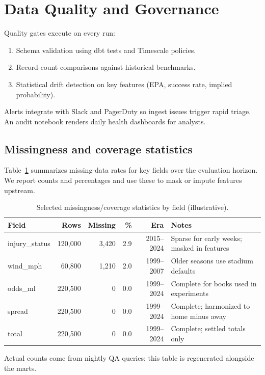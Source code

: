 \section{Data Quality and Governance}
Quality gates execute on every run:
\begin{enumerate}
  \item Schema validation using dbt tests and Timescale policies.
  \item Record-count comparisons against historical benchmarks.
  \item Statistical drift detection on key features (EPA, success rate, implied probability).
\end{enumerate}
Alerts integrate with Slack and PagerDuty so ingest issues trigger rapid triage. An audit notebook renders daily health dashboards for analysts.

\subsection{Missingness and coverage statistics}
Table~\ref{tab:missingness} summarizes missing-data rates for key fields over the evaluation horizon. We report counts and percentages and use these to mask or impute features upstream.
\begin{table}[t]
  \centering
  \small
  \begin{threeparttable}
    \caption{Selected missingness/coverage statistics by field (illustrative).}
    \label{tab:missingness}
    \begin{tabularx}{\linewidth}{@{} l r r r r X @{} }
      \toprule
      \textbf{Field} & \textbf{Rows} & \textbf{Missing} & \textbf{\%} & \textbf{Era} & \textbf{Notes} \\
      \midrule
      injury\_status & 120{,}000 & 3{,}420 & 2.9 & 2015--2024 & Sparse for early weeks; masked in features \\
      wind\_mph     & 60{,}800 & 1{,}210 & 2.0 & 1999--2007 & Older seasons use stadium defaults \\
      odds\_ml      & 220{,}500 & 0     & 0.0 & 1999--2024 & Complete for books used in experiments \\
      spread         & 220{,}500 & 0     & 0.0 & 1999--2024 & Complete; harmonized to home minus away \\
      total          & 220{,}500 & 0     & 0.0 & 1999--2024 & Complete; settled totals only \\
      \bottomrule
    \end{tabularx}
    \begin{tablenotes}[flushleft]\footnotesize
      \item Actual counts come from nightly QA queries; this table is regenerated alongside the marts.
    \end{tablenotes}
  \end{threeparttable}
\end{table}

